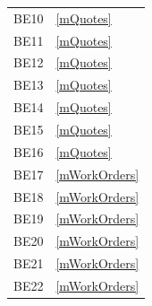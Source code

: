 \documentclass[12pt, titlepage]{article}
\begin{document}
\begin{longtable}{p{} p{}}
	BE10                  & \ref{mQuotes}                                                                                                                                   \\
	BE11                  & \ref{mQuotes}                                                                                                                                   \\
	BE12                  & \ref{mQuotes}                                                                                                                                   \\
	BE13                  & \ref{mQuotes}                                                                                                                                   \\
	BE14                  & \ref{mQuotes}                                                                                                                                   \\
	BE15                  & \ref{mQuotes}                                                                                                                                   \\
	BE16                  & \ref{mQuotes}                                                                                                                                   \\
	BE17                  & \ref{mWorkOrders}                                                                                                                               \\
	BE18                  & \ref{mWorkOrders}                                                                                                                               \\
	BE19                  & \ref{mWorkOrders}                                                                                                                               \\
	BE20                  & \ref{mWorkOrders}                                                                                                                               \\
	BE21                  & \ref{mWorkOrders}                                                                                                                               \\
	BE22                  & \ref{mWorkOrders}                                                                                                                               \\

\end{longtable}
\end{document}
